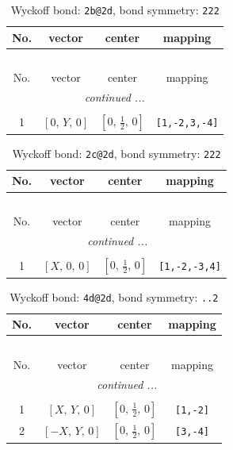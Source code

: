 \documentclass[fleqn,8pt]{jsarticle}
\begin{document}
\begin{longtable}{cccc}
\caption{Wyckoff bond: {\tt 2b@2d}, bond symmetry: {\tt 222}}
 \\
 \hline \hline
No. & vector & center & mapping \\ \hline \endfirsthead

\multicolumn{3}{l}{\tablename\ \thetable{}} \\
 \hline \hline
No. & vector & center & mapping \\ \hline \endhead

 \hline \hline
\multicolumn{3}{r}{\footnotesize\it continued ...} \\ \endfoot

 \hline \hline
\multicolumn{3}{r}{} \\ \endlastfoot

1 & $\left[ 0,\, Y,\, 0 \right]$ & $\left[ 0,\, \frac{1}{2},\, 0 \right]$ & {\tt [1,-2,3,-4]} \\
\end{longtable}
\renewcommand{\arraystretch}{1.2}
\begin{longtable}{cccc}
\caption{Wyckoff bond: {\tt 2c@2d}, bond symmetry: {\tt 222}}
 \\
 \hline \hline
No. & vector & center & mapping \\ \hline \endfirsthead

\multicolumn{3}{l}{\tablename\ \thetable{}} \\
 \hline \hline
No. & vector & center & mapping \\ \hline \endhead

 \hline \hline
\multicolumn{3}{r}{\footnotesize\it continued ...} \\ \endfoot

 \hline \hline
\multicolumn{3}{r}{} \\ \endlastfoot

1 & $\left[ X,\, 0,\, 0 \right]$ & $\left[ 0,\, \frac{1}{2},\, 0 \right]$ & {\tt [1,-2,-3,4]} \\
\end{longtable}
\renewcommand{\arraystretch}{1.2}
\begin{longtable}{cccc}
\caption{Wyckoff bond: {\tt 4d@2d}, bond symmetry: {\tt ..2}}
 \\
 \hline \hline
No. & vector & center & mapping \\ \hline \endfirsthead

\multicolumn{3}{l}{\tablename\ \thetable{}} \\
 \hline \hline
No. & vector & center & mapping \\ \hline \endhead

 \hline \hline
\multicolumn{3}{r}{\footnotesize\it continued ...} \\ \endfoot

 \hline \hline
\multicolumn{3}{r}{} \\ \endlastfoot

1 & $\left[ X,\, Y,\, 0 \right]$ & $\left[ 0,\, \frac{1}{2},\, 0 \right]$ & {\tt [1,-2]} \\ \hline
2 & $\left[ - X,\, Y,\, 0 \right]$ & $\left[ 0,\, \frac{1}{2},\, 0 \right]$ & {\tt [3,-4]} \\
\end{longtable}
\end{document}
